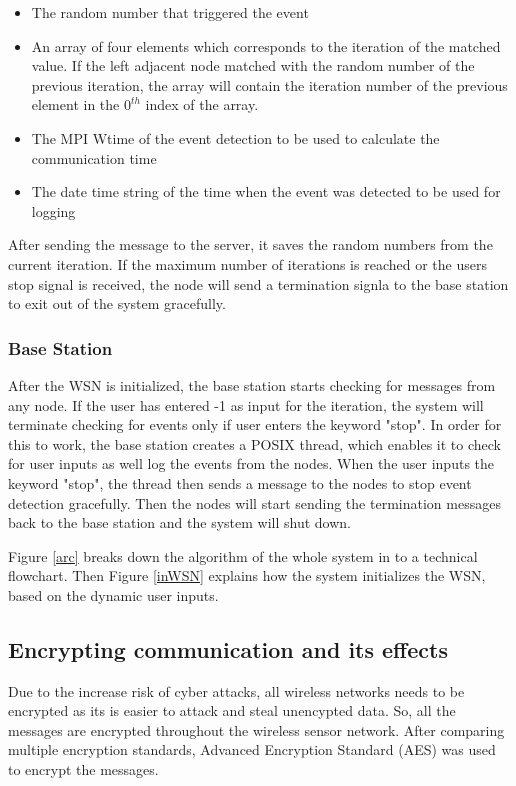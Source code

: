 \documentclass[conference]{IEEEtran}
\begin{document}
		\begin{itemize}
		\item The random number that triggered the event
		\item An array of four elements which corresponds to the iteration of the matched value. If the left adjacent node matched with the random number of the previous iteration, the array will contain the iteration number of the previous element in the $0^{th}$ index of the array. 
		\item The MPI Wtime of the event detection to be used to calculate the communication time
		\item The date time string of the time when the event was detected to be used for logging
	\end{itemize}
	
	After sending the message to the server, it saves the random numbers from the current iteration. If the maximum number of iterations is reached or the users stop signal is received, the node will send a termination signla to the base station to exit out of the system gracefully.
	

	\subsubsection{Base Station}
	After the WSN is initialized, the base station starts checking for messages from any node. If the user has entered -1 as input for the iteration, the system will terminate checking for events only if user enters the keyword "stop". In order for this to work, the base station creates a POSIX thread, which enables it to check for user inputs as well log the events from the nodes. When the user inputs the keyword "stop", the thread then sends a message to the nodes to stop event detection gracefully. Then the nodes will start sending the termination messages back to the base station and the system will shut down.
	
	Figure \ref{arc} breaks down the algorithm of the whole system in to a technical flowchart. Then Figure \ref{inWSN} explains how the system initializes the WSN, based on the dynamic user inputs.
	
	\subsection{ Encrypting communication and its effects }\label{encryption}
	
	Due to the increase risk of cyber attacks, all wireless networks needs to be encrypted as its is easier to attack and steal unencypted data. So, all the messages are encrypted throughout the wireless sensor network. After comparing multiple encryption standards, Advanced Encryption Standard (AES) was used to encrypt the messages.
	
\end{document}
